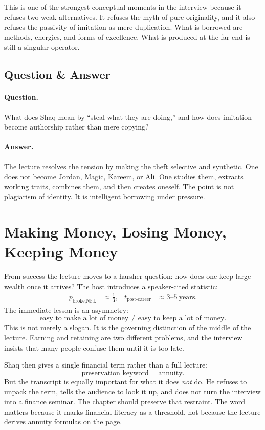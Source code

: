 This is one of the strongest conceptual moments in the interview because it refuses two weak alternatives. It refuses the myth of pure originality, and it also refuses the passivity of imitation as mere duplication. What is borrowed are methods, energies, and forms of excellence. What is produced at the far end is still a singular operator.

\subsection{Question \& Answer}

\paragraph{Question.} What does Shaq mean by ``steal what they are doing,'' and how does imitation become authorship rather than mere copying?

\paragraph{Answer.} The lecture resolves the tension by making the theft selective and synthetic. One does not become Jordan, Magic, Kareem, or Ali. One studies them, extracts working traits, combines them, and then creates oneself. The point is not plagiarism of identity. It is intelligent borrowing under pressure.

\section{Making Money, Losing Money, Keeping Money}

From success the lecture moves to a harsher question: how does one keep large wealth once it arrives? The host introduces a speaker-cited statistic:
\begin{align}
p_{\text{broke,NFL}} &\approx \frac{1}{3}, &
t_{\text{post-career}} &\approx 3\text{--}5\ \text{years}.
\end{align}
The immediate lesson is an asymmetry:
\begin{equation}
\text{easy to make a lot of money} \neq \text{easy to keep a lot of money}.
\end{equation}
This is not merely a slogan. It is the governing distinction of the middle of the lecture. Earning and retaining are two different problems, and the interview insists that many people confuse them until it is too late.

Shaq then gives a single financial term rather than a full lecture:
\begin{equation}
\text{preservation keyword} = \text{annuity}.
\end{equation}
But the transcript is equally important for what it does \emph{not} do. He refuses to unpack the term, tells the audience to look it up, and does not turn the interview into a finance seminar. The chapter should preserve that restraint. The word matters because it marks financial literacy as a threshold, not because the lecture derives annuity formulas on the page.

